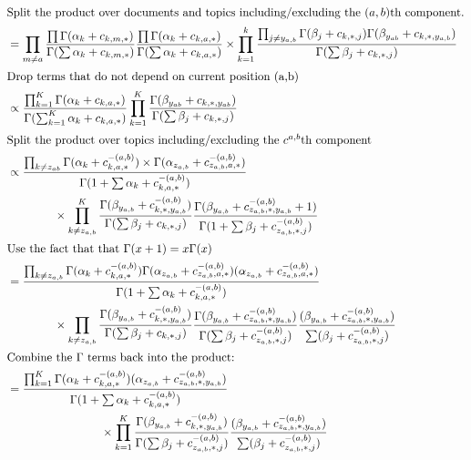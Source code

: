 \documentclass{article}%
\theoremstyle{definition}
\begin{document}
\begin{align}
    \intertext{Split the product over documents and topics including/excluding the $(a,b)$th component.}
        &= \prod_{m \neq a}^{}\frac{\prod \Gamma(\alpha_k + c_{k,m,*})}{\Gamma(\sum \alpha_k + c_{k,m,*})}\frac{\prod \Gamma(\alpha_k + c_{k,a,*})}{\Gamma(\sum \alpha_k + c_{k,a,*})} \times \prod_{k=1}^k \frac{\prod_{j\neq y_{a,b}}^{}\Gamma(\beta_j + c_{k,*,j}) \Gamma(\beta_{y_{ab}} + c_{k,*,y_{a,b}})}{\Gamma(\sum \beta_j + c_{k,*,j}) } \\
    \intertext{Drop terms that do not depend on current position (a,b)}
        &\propto \frac{\prod_{k=1}^{K}\Gamma(\alpha_k + c_{k,a,*})}{\Gamma(\sum_{k=1}^{K}\alpha_k + c_{k,a,*})} \prod_{k=1}^{K}\frac{\Gamma(\beta_{y_{ab}}+ c_{k,*,y_{ab}})}{\Gamma(\sum \beta_j + c_{k,*,j})} \\
    \intertext{Split the product over topics including/excluding the $c^{a,b}$th component}
        &\propto \frac{\prod_{k \neq z_{ab}}^{} \Gamma(\alpha_k + c_{k,a,*}^{-(a,b)}) \times \Gamma(\alpha_{z_{a,b}}+ c_{z_{a,b},a,*}^{-(a,b)})}{\Gamma(1+ \sum \alpha_k + c_{k,a,*}^{-(a,b)})} \\
        \nonumber &\qquad \qquad \times \prod_{k\neq z_{a,b}}^{K}\frac{\Gamma(\beta_{y_{a,b}}+ c_{k,*,y_{a,b}}^{-(a,b)})}{\Gamma(\sum \beta_j + c_{k,*,j})} \frac{\Gamma(\beta_{y_{a,b}}+c_{z_{a,b},*,y_{a,b}}^{-(a,b)}+1)}{\Gamma(1+\sum \beta_j + c_{z_{a,b},*,j}^{-(a,b)})} \\
    \intertext{Use the fact that that $\Gamma(x+1) = x\Gamma(x)$}
        &= \frac{\prod_{k \neq z_{a,b}}^{} \Gamma(\alpha_k + c_{k,a,*}^{-(a,b)})\Gamma(\alpha_{z_{a,b}}+c_{z_{a,b},a,*}^{-(a,b)})(\alpha_{z_{a,b}}+c_{z_{a,b},a,*}^{-(a,b)})}{\Gamma(1+\sum \alpha_k + c_{k,a,*}^{-(a,b)})} \\
        \nonumber &\qquad \qquad \times \prod_{k\neq z_{a,b}}^{} \frac{\Gamma(\beta_{y_{a,b}}+c_{k,*,y_{a,b}}^{-(a,b)})}{\Gamma(\sum \beta_j + c_{k,*,j})} \frac{\Gamma(\beta_{y_{a,b}}+c_{z_{a,b},*,y_{a,b}}^{-(a,b)})}{\Gamma(\sum \beta_j + c_{z_{a,b},*,j}^{-(a,b)})} \frac{(\beta_{y_{a,b}}+c_{z_{a,b},*,y_{a,b}}^{-(a,b)})}{\sum (\beta_j + c_{z_{a,b},*,j}^{-(a,b)})} \\
    \intertext{Combine the $\Gamma$ terms back into the product:}
        &= \frac{\prod_{k=1}^{K}\Gamma(\alpha_k + c_{k,a,*}^{-(a,b)})(\alpha_{z_{a,b}}+c_{z_{a,b},*,y_{a,b}}^{-(a,b)})}{\Gamma(1+\sum \alpha_k + c_{k,a,*}^{-(a,b)})} \\
        \nonumber &\qquad \qquad \qquad \qquad \times \prod_{k=1}^{K}\frac{\Gamma(\beta_{y_{a,b}}+c_{k,*,y_{a,b}}^{-(a,b)})}{\Gamma(\sum \beta_j + c_{z_{a,b},*,j}^{-(a,b)})}\frac{(\beta_{y_{a,b}}+ c_{z_{a,b},*,y_{a,b}}^{-(a,b)})}{\sum(\beta_j + c_{z_{a,b},*,j}^{-(a,b)})} \\

\end{align}
\end{document}
